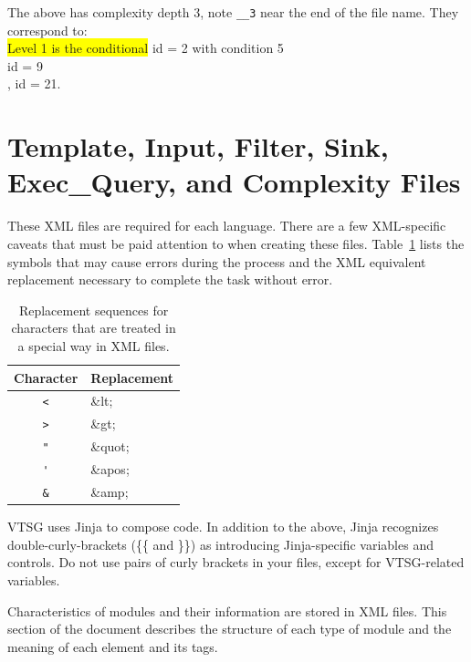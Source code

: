\documentclass[12pt]{article}
\begin{document}
The above has complexity depth 3, note \verb|__3| near the end of 
the file
name. They correspond to:\\
{\colorbox{yellow}{Level 1 is the conditional}} id = 2 with condition 5\\
 id = 9\\
, id = 21.

\section{Template, Input, Filter, Sink, Exec\_Query, and Complexity Files}
\label{sec:source files}

These XML files are required for each language.
There 
are a few XML-specific caveats that must be paid attention to when 
creating these files. 
Table~\ref{tab:XML escapes} lists the symbols that may cause errors 
during the process and the XML equivalent replacement necessary to 
complete the
task without error.

\begin{table}[H]
\centering
\begin{tabular}{|c|l|}
\hline
\textbf{Character} & \textbf{Replacement} \\
\hline
 \verb|<| & \&lt; \\
\hline
 \verb|>| & \&gt; \\
\hline
 \verb|"| & \&quot; \\
\hline
 \verb|'| & \&apos; \\
\hline
 \verb|&| & \&amp; \\
\hline
\end{tabular}
\caption{Replacement sequences for characters that are treated 
in a special way in XML files.}
\label{tab:XML escapes}
\end{table}

VTSG uses Jinja to compose code. In addition to the above, Jinja recognizes
double-curly-brackets (\{\{ and \}\}) as introducing Jinja-specific variables and
controls.  Do not use pairs of curly brackets in your files, except for VTSG-related
variables.

Characteristics of modules and their information are stored in 
XML files.  
This section of the document describes the structure of each type of module and
the meaning
of each element and its tags.
\end{document}
